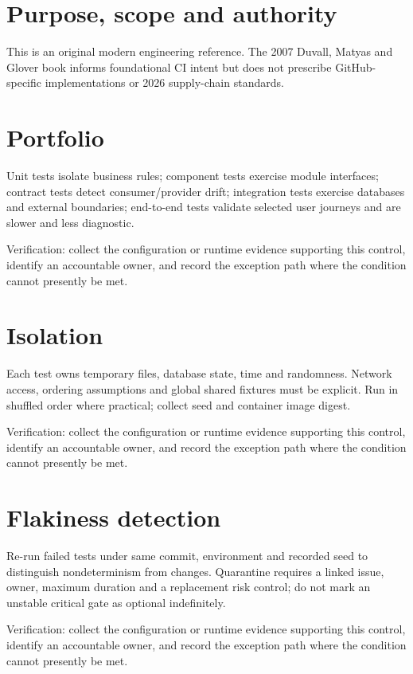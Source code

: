 \documentclass[11pt,letterpaper]{article}
\begin{document}
\makedoctitle
\makedocsummary
\tableofcontents
\clearpage
\section{Purpose, scope and authority}
This is an original modern engineering reference. The 2007 Duvall, Matyas and Glover book informs foundational CI intent but does not prescribe GitHub-specific implementations or 2026 supply-chain standards.

\section{Portfolio}
Unit tests isolate business rules; component tests exercise module interfaces; contract tests detect consumer/provider drift; integration tests exercise databases and external boundaries; end-to-end tests validate selected user journeys and are slower and less diagnostic.

Verification: collect the configuration or runtime evidence supporting this control, identify an accountable owner, and record the exception path where the condition cannot presently be met.

\section{Isolation}
Each test owns temporary files, database state, time and randomness. Network access, ordering assumptions and global shared fixtures must be explicit. Run in shuffled order where practical; collect seed and container image digest.

Verification: collect the configuration or runtime evidence supporting this control, identify an accountable owner, and record the exception path where the condition cannot presently be met.

\section{Flakiness detection}
Re-run failed tests under same commit, environment and recorded seed to distinguish nondeterminism from changes. Quarantine requires a linked issue, owner, maximum duration and a replacement risk control; do not mark an unstable critical gate as optional indefinitely.

Verification: collect the configuration or runtime evidence supporting this control, identify an accountable owner, and record the exception path where the condition cannot presently be met.
\end{document}
